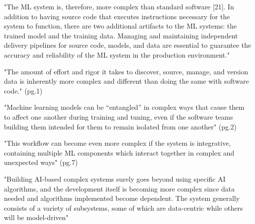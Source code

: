


\parencite{Alves2024PracticesReview}

"The ML system is, therefore, more complex than standard software [21].
In addition to having source code that executes instructions necessary for the
system to function, there are two additional artifacts to the ML systems:
the trained model and the training data. Managing and maintaining independent
delivery pipelines for source code, models, and data are essential to guarantee
the accuracy and reliability of the ML system in the production environment."


\parencite{Amershi2019SoftwareStudy}

"The amount of effort and rigor it takes to discover, source, manage,
and version data is inherently more complex and different than doing
the same with software code." (pg.1)

"Machine learning models can be “entangled” in complex ways that cause them
to affect one another during training and tuning, even if the software teams
building them intended for them to remain isolated from one another" (pg.2)

"This workflow can become even more complex if the system is integrative,
containing multiple ML components which interact together in complex and
unexpected ways" (pg.7)


\parencite{Nguyen-Duc2020AIndustry}


\parencite{Belani2019RequirementsSystems}

"Building AI-based complex systems surely goes beyond using specific AI
algorithms, and the development itself is becoming more complex since data
needed and algorithms implemented become dependent. The system generally
consists of a variety of subsystems, some of which are data-centric while others
will be model-driven"

